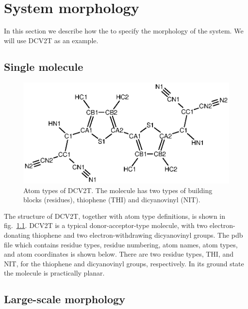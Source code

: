 \chapter{System morphology}
In this section we describe how the to specify the morphology of the system. We will use DCV2T as an example.

\section{Single molecule}

\begin{figure}
\includegraphics[width=\linewidth]{./fig/chemical_structure/dcv2t_atom_types}
\caption{\small Atom types of DCV2T. The molecule has two types of building blocks (residues), thiophene (THI) and dicyanovinyl (NIT). }
\label{fig:dcv2t_at}
\end{figure}

The structure of DCV2T, together with atom type definitions, is shown in fig.~\ref{fig:dcv2t_at}. DCV2T is a typical donor-acceptor-type molecule, with two electron-donating thiophene and two electron-withdrawing dicyanovinyl groups. The pdb file which contains residue types, residue numbering, atom names, atom types, and atom coordinates is shown below. There are two residue types, THI, and NIT, for the thiophene and dicyanovinyl groups, respectively. In its ground state the molecule is practically planar. 



\section{Large-scale morphology}